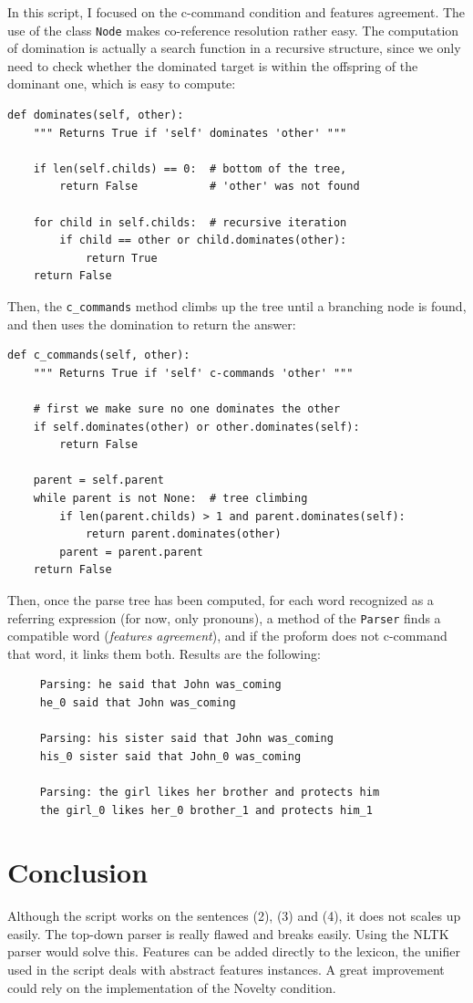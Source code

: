 \documentclass[a4paper]{article}
\theoremstyle{definition}
\begin{document}
In this script, I focused on the c-command condition and features agreement. The use of the class \texttt{Node} makes co-reference resolution rather easy. The computation of domination is actually a search function in a recursive structure, since we only need to check whether the dominated target is within the offspring of the dominant one, which is easy to compute:
\begin{verbatim}
def dominates(self, other):
    """ Returns True if 'self' dominates 'other' """

    if len(self.childs) == 0:  # bottom of the tree,
        return False           # 'other' was not found

    for child in self.childs:  # recursive iteration
        if child == other or child.dominates(other):  
            return True
    return False
\end{verbatim}
Then, the \texttt{c\_commands} method climbs up the tree until a branching node is found, and then uses the domination to return the answer:
\begin{verbatim}
def c_commands(self, other):
    """ Returns True if 'self' c-commands 'other' """

    # first we make sure no one dominates the other
    if self.dominates(other) or other.dominates(self):
        return False

    parent = self.parent
    while parent is not None:  # tree climbing
        if len(parent.childs) > 1 and parent.dominates(self):
            return parent.dominates(other)
        parent = parent.parent
    return False
\end{verbatim}


Then, once the parse tree has been computed, for each word recognized as a referring expression (for now, only pronouns), a method of the \texttt{Parser} finds a compatible word (\emph{features agreement}), and if the proform does not c-command that word, it links them both. Results are the following:

\begin{verbatim}
     Parsing: he said that John was_coming
     he_0 said that John was_coming

     Parsing: his sister said that John was_coming
     his_0 sister said that John_0 was_coming

     Parsing: the girl likes her brother and protects him
     the girl_0 likes her_0 brother_1 and protects him_1
\end{verbatim}

\section{Conclusion}
Although the script works on the sentences (2), (3) and (4), it does not scales up easily. The top-down parser is really flawed and breaks easily. Using the NLTK parser \cite{nltk} would solve this. Features can be added directly to the lexicon, the unifier used in the script deals with abstract features instances. A great improvement could rely on the implementation of the Novelty condition.



\end{document}
